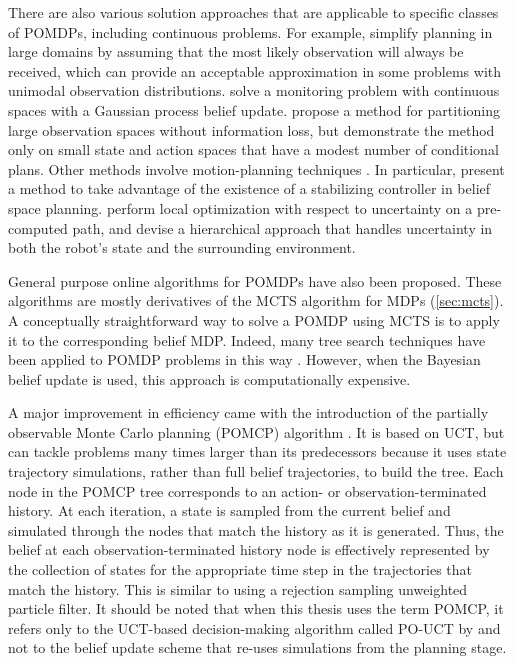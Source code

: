 There are also various solution approaches that are applicable to specific classes of POMDPs, including continuous problems.
For example, \citet{platt2010belief} simplify planning in large domains by assuming that the most likely observation will always be received, which can provide an acceptable approximation in some problems with unimodal observation distributions.
\citet{morere2016bayesian} solve a monitoring problem with continuous spaces with a Gaussian process belief update.
\citet{hoey2005solving} propose a method for partitioning large observation spaces without information loss, but demonstrate the method only on small state and action spaces that have a modest number of conditional plans.
Other methods involve motion-planning techniques \cite{melchior2007particle,prentice2009belief,bry2011rapidly}.
In particular, \citet{agha2011firm} present a method to take advantage of the existence of a stabilizing controller in belief space planning.
\citet{van2012motion} perform local optimization with respect to uncertainty on a pre-computed path, and \citet{indelman2015planning} devise a hierarchical approach that handles uncertainty in both the robot's state and the surrounding environment.

General purpose online algorithms for POMDPs have also been proposed.
These algorithms are mostly derivatives of the MCTS algorithm for MDPs (\cref{sec:mcts}).
A conceptually straightforward way to solve a POMDP using MCTS is to apply it to the corresponding belief MDP.
Indeed, many tree search techniques have been applied to POMDP problems in this way \cite{ross2008online}.
However, when the Bayesian belief update is used, this approach is computationally expensive.

A major improvement in efficiency came with the introduction of the partially observable Monte Carlo planning (POMCP) algorithm \cite{silver2016mastering}. It is based on UCT, but can tackle problems many times larger than its predecessors because it uses state trajectory simulations, rather than full belief trajectories, to build the tree.
Each node in the POMCP tree corresponds to an action- or observation-terminated history.
At each iteration, a state is sampled from the current belief and simulated through the nodes that match the history as it is generated.
Thus, the belief at each observation-terminated history node is effectively represented by the collection of states for the appropriate time step in the trajectories that match the history. This is similar to using a rejection sampling unweighted particle filter.
It should be noted that when this thesis uses the term POMCP, it refers only to the UCT-based decision-making algorithm called PO-UCT by \citet{silver2016mastering} and not to the belief update scheme that re-uses simulations from the planning stage.

